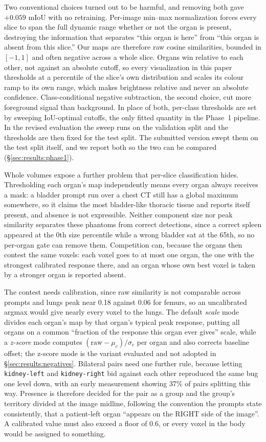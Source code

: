 \documentclass[10pt]{article}
\newcommand{\org}[1]{\texttt{#1}}
\begin{document}
Two conventional choices turned out to be harmful, and removing both gave $+0.059$
mIoU with no retraining. Per-image min--max normalization forces every slice to
span the full dynamic range whether or not the organ is present, destroying the
information that separates ``this organ is here'' from ``this organ is absent from
this slice.'' Our maps are therefore raw cosine similarities, bounded in $[-1,1]$
and often negative across a whole slice. Organs win relative to each other, not
against an absolute cutoff, so every visualization in this paper thresholds at a
percentile of the slice's own distribution and scales its colour ramp to its own
range, which makes brightness relative and never an absolute confidence.
Class-conditional
negative subtraction, the second choice, cut more foreground signal than
background. In place of both, per-class thresholds are set by sweeping IoU-optimal
cutoffs, the only fitted quantity in the Phase~1 pipeline. In the revised
evaluation the sweep runs on the validation split and the thresholds are then
fixed for the test split. The submitted version swept them on the test split
itself, and we report both so the two can be compared
(\S\ref{sec:results:phase1}).

Whole volumes expose a further problem that per-slice classification hides.
Thresholding each organ's map independently means every organ always receives a
mask: a bladder prompt run over a chest CT still has a global maximum somewhere,
so it claims the most bladder-like thoracic tissue and reports itself present, and
absence is not expressible. Neither component size nor peak similarity separates
these phantoms from correct detections, since a correct spleen appeared at the 0th
size percentile while a wrong bladder sat at the 65th, so no per-organ gate can
remove them. Competition can, because
the organs then contest the same voxels: each voxel goes to at most one organ, the
one with the strongest calibrated response there, and an organ whose own best
voxel is taken by a stronger organ is reported absent.

The contest needs calibration, since raw similarity is not comparable across
prompts and lungs peak near 0.18 against 0.06 for femurs, so an uncalibrated
argmax would give nearly every voxel to the lungs. The default \emph{scale} mode
divides each organ's map by that organ's typical peak response, putting all organs
on a common ``fraction of the response this organ ever gives'' scale, while a
\emph{z-score} mode computes $(\text{raw}-\mu_c)/\sigma_c$ per organ and also
corrects baseline offset; the z-score mode is the variant evaluated and not
adopted in \S\ref{sec:results:negatives}. Bilateral pairs need one further rule,
because letting \org{kidney-left} and \org{kidney-right} bid against each other
reproduced the same bug one level down, with an early measurement showing 37\% of
pairs splitting this way. Presence is therefore decided for the pair as a group
and the group's territory divided at the image midline, following the convention
the prompts state consistently, that a patient-left organ ``appears on the RIGHT
side of the image''. A calibrated value must also exceed a floor of 0.6, or every
voxel in the body would be assigned to something.
\end{document}
